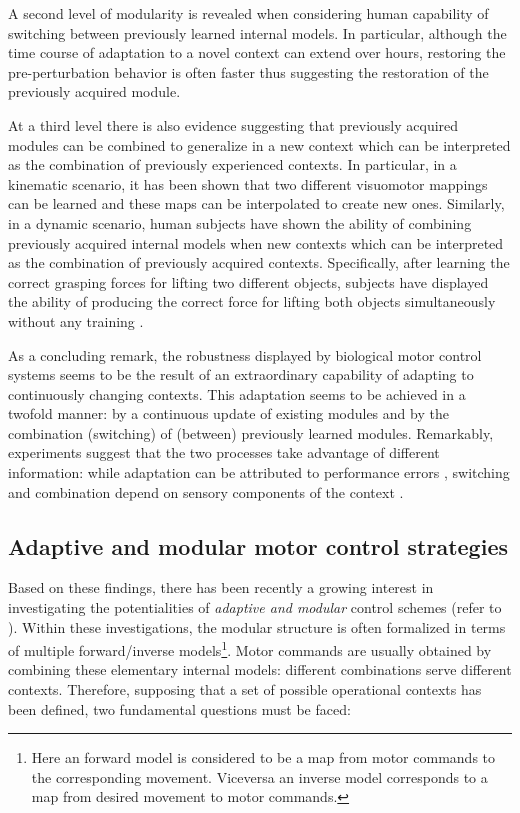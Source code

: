 \documentclass{svmult}
\begin{document}
A second level of modularity 
is revealed when considering human capability of switching 
between previously learned internal models. In particular, 
although the time course of adaptation to a novel context can 
extend over hours, restoring the pre-perturbation behavior is 
often faster \cite{welch93alternating,brashers-krug96consolidation}
thus suggesting the restoration of the previously acquired module. 

At a third level there is also evidence suggesting that 
previously acquired modules can be combined to generalize
in a new context which can be interpreted as the combination
of previously experienced contexts. In particular, in a 
kinematic scenario, it has been shown that two different 
visuomotor mappings can be learned 
\cite{ghahramani97modular} and these maps can be interpolated
to create new ones. Similarly, in a dynamic scenario, 
human subjects have shown the ability of combining previously 
acquired internal models when new contexts which can be
interpreted as the combination of previously acquired contexts.
Specifically, after learning the correct grasping forces 
for lifting two different objects, subjects have displayed
the ability of producing the correct force for lifting both
objects simultaneously without any training \cite{davidson04internal}.

As a concluding remark, the robustness displayed by biological motor control
systems seems to be the result of an extraordinary capability of adapting to
continuously changing contexts. This adaptation seems to be achieved in a twofold
manner: by a continuous update of existing modules and by the combination (switching)
of (between) previously learned modules. Remarkably, experiments suggest that the two
processes take advantage of different information: while adaptation 
can be attributed to performance errors \cite{Shadmehr}, switching and 
combination depend on sensory components of the context \cite{Shelhamer}. 

\subsection{Adaptive and modular motor control strategies}

Based on these findings, there has been recently a growing interest
in investigating the potentialities of \emph{adaptive and modular}
control schemes (refer to \cite{WolpertKawato1998, Mussa-Ivaldi}).
Within these investigations, the modular structure is often
formalized in terms of multiple forward/inverse models\footnote{Here an
forward model is considered to be a map from motor commands to the 
corresponding movement. Viceversa an inverse model corresponds to 
a map from desired movement to motor commands.}. Motor commands are 
usually obtained by combining these elementary internal models: different
combinations serve different contexts. Therefore, supposing that a set 
of possible operational contexts has been defined, two fundamental questions 
must be faced:
\end{document}
